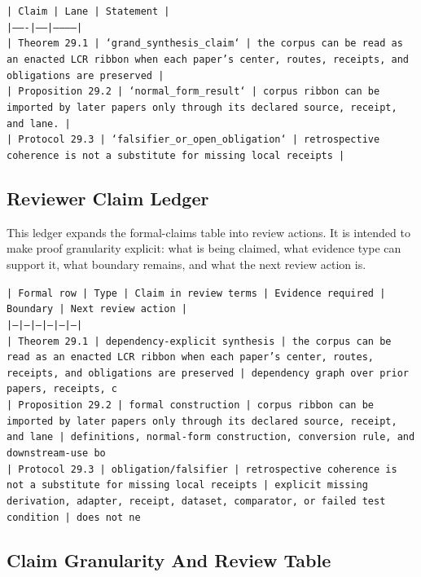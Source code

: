 \documentclass[11pt]{article}
\begin{document}
\noindent\texttt{| Claim | Lane | Statement |}\\
\noindent\texttt{|-------|------|-----------|}\\
\noindent\texttt{| Theorem 29.1 | `grand\_synthesis\_claim` | the corpus can be read as an enacted LCR ribbon when each paper's center, routes, receipts, and obligations are preserved |}\\
\noindent\texttt{| Proposition 29.2 | `normal\_form\_result` | corpus ribbon can be imported by later papers only through its declared source, receipt, and lane. |}\\
\noindent\texttt{| Protocol 29.3 | `falsifier\_or\_open\_obligation` | retrospective coherence is not a substitute for missing local receipts |}\\

\subsection*{Reviewer Claim Ledger}

This ledger expands the formal-claims table into review actions. It is intended to make proof granularity explicit: what is being claimed, what evidence type can support it, what boundary remains, and what the next review action is.

\noindent\texttt{| Formal row | Type | Claim in review terms | Evidence required | Boundary | Next review action |}\\
\noindent\texttt{|---|---|---|---|---|---|}\\
\noindent\texttt{| Theorem 29.1 | dependency-explicit synthesis | the corpus can be read as an enacted LCR ribbon when each paper's center, routes, receipts, and obligations are preserved | dependency graph over prior papers, receipts, c}\\
\noindent\texttt{| Proposition 29.2 | formal construction | corpus ribbon can be imported by later papers only through its declared source, receipt, and lane | definitions, normal-form construction, conversion rule, and downstream-use bo}\\
\noindent\texttt{| Protocol 29.3 | obligation/falsifier | retrospective coherence is not a substitute for missing local receipts | explicit missing derivation, adapter, receipt, dataset, comparator, or failed test condition | does not ne}\\

\subsection*{Claim Granularity And Review Table}
\end{document}
